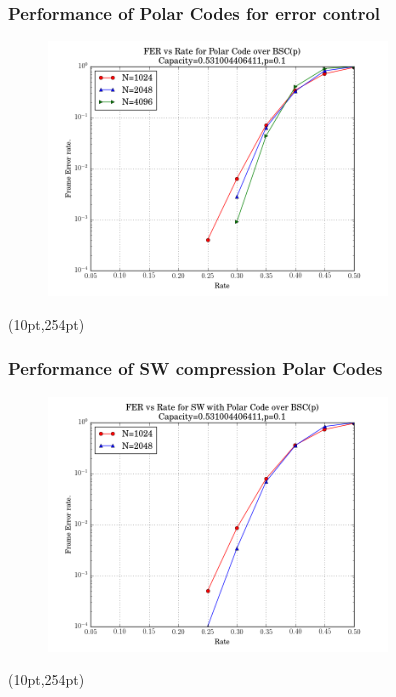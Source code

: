 \documentclass[xcolor=dvipsnames]{beamer}
\newcommand\hyperback[1]{%
  \begin{textblock*}{\paperwidth}(10pt,254pt)
    \raggedright #1\hspace{.5em}
  \end{textblock*}}
\begin{document}
\begin{frame}[label = polarperformance]
\frametitle{Performance of Polar Codes for error control}
\begin{figure}
\centering
\includegraphics[width=9cm]{./fer.png}
\end{figure}
\hyperback{\hyperlink{polarencodedecode}{}}
\end{frame}
\begin{frame}[label = polarswperformance]
\frametitle{Performance of SW compression Polar Codes}
\begin{figure}
\centering
\includegraphics[width=9cm]{./swfer.png}
\end{figure}
\hyperback{\hyperlink{polarslepian}{}}
\end{frame}
\end{document}
